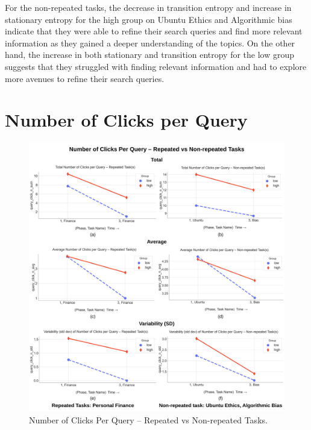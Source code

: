 \documentclass[letterpaper, nobind]{templates/ociamthesis}
\begin{document}
For the non-repeated tasks, the decrease in transition entropy and increase in stationary entropy for the high group on Ubuntu Ethics and Algorithmic bias indicate that they were able to refine their search queries and find more relevant information as they gained a deeper understanding of the topics. On the other hand, the increase in both stationary and transition entropy for the low group suggests that they struggled with finding relevant information and had to explore more avenues to refine their search queries.

\hypertarget{number-of-clicks-per-query-1}{%
\section{Number of Clicks per Query}\label{number-of-clicks-per-query-1}}

\begin{figure}

{\centering \includegraphics[width=1\linewidth]{figs/rp13-query-click} 

}

\caption[Number of Clicks Per Query -- Repeated vs Non-repeated Tasks.]{Number of Clicks Per Query -- Repeated vs Non-repeated Tasks.}\label{fig:rp13-query-click}
\end{figure}
\end{document}
